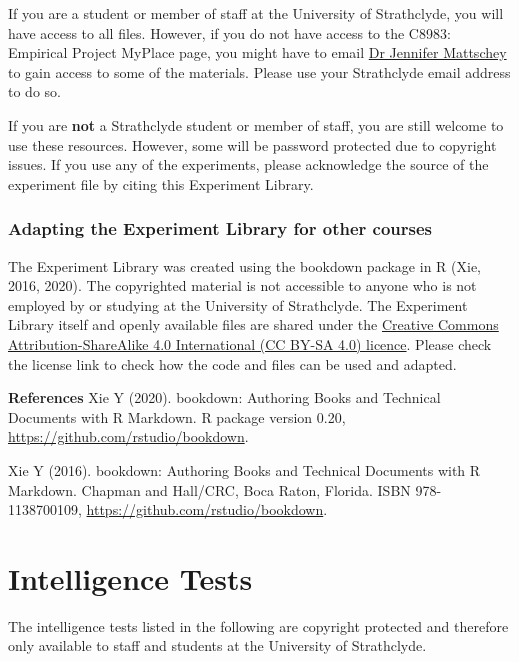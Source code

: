 \documentclass[
]{book}
\begin{document}
If you are a student or member of staff at the University of Strathclyde, you will have access to all files. However, if you do not have access to the C8983: Empirical Project MyPlace page, you might have to email \href{jennifer.mattschey@strath.ac}{Dr Jennifer Mattschey} to gain access to some of the materials. Please use your Strathclyde email address to do so.

If you are \textbf{not} a Strathclyde student or member of staff, you are still welcome to use these resources. However, some will be password protected due to copyright issues. If you use any of the experiments, please acknowledge the source of the experiment file by citing this Experiment Library.

\hypertarget{adapting-the-experiment-library-for-other-courses}{%
\subsection{Adapting the Experiment Library for other courses}\label{adapting-the-experiment-library-for-other-courses}}

The Experiment Library was created using the bookdown package in R (Xie, 2016, 2020). The copyrighted material is not accessible to anyone who is not employed by or studying at the University of Strathclyde. The Experiment Library itself and openly available files are shared under the \href{https://creativecommons.org/licenses/by-sa/4.0/}{Creative Commons Attribution-ShareAlike 4.0 International (CC BY-SA 4.0) licence}. Please check the license link to check how the code and files can be used and adapted.

\textbf{References}
Xie Y (2020). bookdown: Authoring Books and Technical Documents with R Markdown. R package version 0.20, \url{https://github.com/rstudio/bookdown}.

Xie Y (2016). bookdown: Authoring Books and Technical Documents with R Markdown. Chapman and Hall/CRC, Boca Raton, Florida. ISBN 978-1138700109, \url{https://github.com/rstudio/bookdown}.

\hypertarget{intelligence-tests}{%
\chapter{Intelligence Tests}\label{intelligence-tests}}

The intelligence tests listed in the following are copyright protected and therefore only available to staff and students at the University of Strathclyde.
\end{document}
